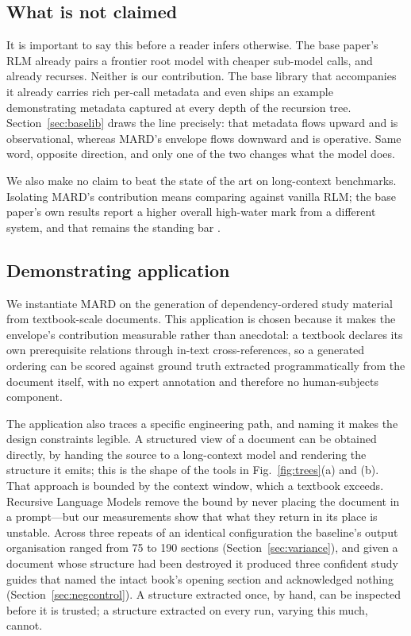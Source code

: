 \documentclass[conference]{IEEEtran}
\begin{document}
\subsection{What is not claimed}
It is important to say this before a reader infers otherwise. The base
paper's RLM already pairs a frontier root model with cheaper sub-model calls,
and already recurses. Neither is our contribution. The base library that
accompanies it already carries rich per-call metadata and even ships an
example demonstrating metadata captured at every depth of the recursion tree.
Section~\ref{sec:baselib} draws the line precisely: that metadata flows
upward and is observational, whereas MARD's envelope flows downward and is
operative. Same word, opposite direction, and only one of the two changes
what the model does.

We also make no claim to beat the state of the art on long-context
benchmarks. Isolating MARD's contribution means comparing against vanilla
RLM; the base paper's own results report a higher overall high-water mark
from a different system, and that remains the standing bar
\cite{zhang2025rlm}.

\subsection{Demonstrating application}
We instantiate MARD on the generation of dependency-ordered study material
from textbook-scale documents. This application is chosen because it makes
the envelope's contribution measurable rather than anecdotal: a textbook
declares its own prerequisite relations through in-text cross-references, so
a generated ordering can be scored against ground truth extracted
programmatically from the document itself, with no expert annotation and
therefore no human-subjects component.

The application also traces a specific engineering path, and naming it makes
the design constraints legible. A structured view of a document can be
obtained directly, by handing the source to a long-context model and rendering
the structure it emits; this is the shape of the tools in
Fig.~\ref{fig:trees}(a) and (b). That approach is bounded by the context
window, which a textbook exceeds. Recursive Language Models remove the bound
by never placing the document in a prompt---but our measurements show that
what they return in its place is unstable. Across three repeats of an
identical configuration the baseline's output organisation ranged from
\num{75} to \num{190} sections (Section~\ref{sec:variance}), and given a
document whose structure had been destroyed it produced three confident study
guides that named the intact book's opening section and acknowledged nothing
(Section~\ref{sec:negcontrol}). A structure extracted once, by hand, can be
inspected before it is trusted; a structure extracted on every run, varying
this much, cannot.
\end{document}

